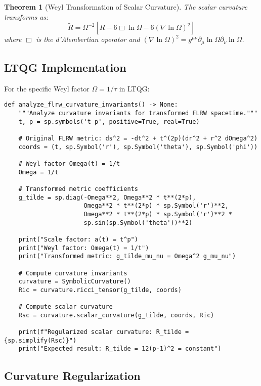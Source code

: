 \documentclass[11pt,a4paper]{article}
\newtheorem{theorem}{Theorem}[section]
\theoremstyle{definition}
\theoremstyle{remark}
\newcommand{\Scal}{R}
\renewcommand{\tilde}[1]{\widetilde{#1}}
\begin{document}
\begin{theorem}[Weyl Transformation of Scalar Curvature]
The scalar curvature transforms as:
\begin{equation}
\tilde{\Scal} = \Omega^{-2} \left[ \Scal - 6 \Box \ln \Omega - 6 (\nabla \ln \Omega)^2 \right]
\end{equation}
where $\Box$ is the d'Alembertian operator and $(\nabla \ln \Omega)^2 = g^{\mu\nu} \partial_\mu \ln \Omega \partial_\nu \ln \Omega$.
\end{theorem}

\subsection{LTQG Implementation}

For the specific Weyl factor $\Omega = 1/\tau$ in LTQG:

\begin{lstlisting}
def analyze_flrw_curvature_invariants() -> None:
    """Analyze curvature invariants for transformed FLRW spacetime."""
    t, p = sp.symbols('t p', positive=True, real=True)
    
    # Original FLRW metric: ds^2 = -dt^2 + t^(2p)(dr^2 + r^2 dOmega^2)
    coords = (t, sp.Symbol('r'), sp.Symbol('theta'), sp.Symbol('phi'))
    
    # Weyl factor Omega(t) = 1/t
    Omega = 1/t
    
    # Transformed metric coefficients
    g_tilde = sp.diag(-Omega**2, Omega**2 * t**(2*p), 
                      Omega**2 * t**(2*p) * sp.Symbol('r')**2,
                      Omega**2 * t**(2*p) * sp.Symbol('r')**2 * 
                      sp.sin(sp.Symbol('theta'))**2)
    
    print("Scale factor: a(t) = t^p")
    print("Weyl factor: Omega(t) = 1/t") 
    print("Transformed metric: g_tilde_mu_nu = Omega^2 g_mu_nu")
    
    # Compute curvature invariants
    curvature = SymbolicCurvature()
    Ric = curvature.ricci_tensor(g_tilde, coords)
    
    # Compute scalar curvature
    Rsc = curvature.scalar_curvature(g_tilde, coords, Ric)
    
    print(f"Regularized scalar curvature: R_tilde = {sp.simplify(Rsc)}")
    print("Expected result: R_tilde = 12(p-1)^2 = constant")
\end{lstlisting}

\subsection{Curvature Regularization}
\end{document}
